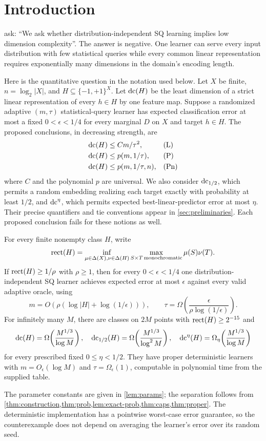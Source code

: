 \section{Introduction}\label{sec:introduction}
\citet{FKS26} ask: ``We ask whether distribution-independent SQ learning implies low dimension complexity''. The answer is negative. One learner can serve every input distribution with few statistical queries while every common linear representation requires exponentially many dimensions in the domain's encoding length.

Here is the quantitative question in the notation used below. Let $X$ be finite, $n=\log_2|X|$, and $H\subseteq\{-1,+1\}^X$. Let $\operatorname{dc}(H)$ be the least dimension of a strict linear representation of every $h\in H$ by one feature map. Suppose a randomized adaptive $(m,\tau)$ statistical-query learner has expected classification error at most a fixed $0<\epsilon<1/4$ for every marginal $D$ on $X$ and target $h\in H$. The proposed conclusions, in decreasing strength, are
\begin{align}
\operatorname{dc}(H)&\le C m/\tau^2, &&\text{(L)}\label{eq:linear-question}\\
\operatorname{dc}(H)&\le p(m,1/\tau), &&\text{(P)}\label{eq:poly-question}\\
\operatorname{dc}(H)&\le p(m,1/\tau,n), &&\text{(Pn)}\label{eq:polyn-question}
\end{align}
where $C$ and the polynomial $p$ are universal. We also consider $\operatorname{dc}_{1/2}$, which permits a random embedding realizing each target exactly with probability at least $1/2$, and $\operatorname{dc}^\eta$, which permits expected best-linear-predictor error at most $\eta$. Their precise quantifiers and tie conventions appear in \cref{sec:preliminaries}. Each proposed conclusion fails for these notions as well.

\begin{maintheorem}
For every finite nonempty class $H$, write
\[
\operatorname{rect}(H)=\inf_{\mu\in\Delta(X),\nu\in\Delta(H)}
 \max_{S\times T\,\mathrm{monochromatic}}\mu(S)\nu(T).
\]
If $\operatorname{rect}(H)\ge1/\rho$ with $\rho\ge1$, then for every $0<\epsilon<1/4$ one distribution-independent SQ learner achieves expected error at most $\epsilon$ against every valid adaptive oracle, using
\[
 m=O\!\left(\rho(\log|H|+\log(1/\epsilon))\right),\qquad
 \tau=\Omega\!\left(\frac{\epsilon}{\rho\log(1/\epsilon)}\right).
\]
For infinitely many $M$, there are classes on $2M$ points with $\operatorname{rect}(H)\ge2^{-15}$ and
\[
 \operatorname{dc}(H)=\Omega\!\left(\frac{M^{1/3}}{\log M}\right),\quad
 \operatorname{dc}_{1/2}(H)=\Omega\!\left(\frac{M^{1/3}}{\log^2 M}\right),\quad
 \operatorname{dc}^\eta(H)=\Omega_\eta\!\left(\frac{M^{1/3}}{\log M}\right)
\]
for every prescribed fixed $0\le\eta<1/2$. They have proper deterministic learners with $m=O_\epsilon(\log M)$ and $\tau=\Omega_\epsilon(1)$, computable in polynomial time from the supplied table.
\end{maintheorem}
The parameter constants are given in \cref{lem:params}; the separation follows from \cref{thm:construction,thm:prob,lem:exact-prob,thm:caps,thm:proper}. The deterministic implementation has a pointwise worst-case error guarantee, so the counterexample does not depend on averaging the learner's error over its random seed.

